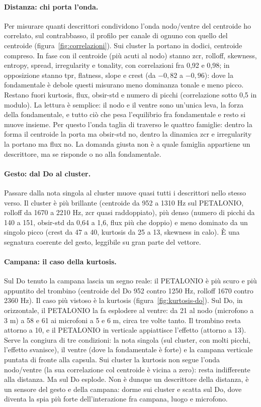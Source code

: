 \documentclass[11pt,a4paper]{article}
\begin{document}
\paragraph{Distanza: chi porta l'onda.} Per misurare quanti descrittori condividono l'onda
nodo/ventre del centroide ho correlato, sul contrabbasso, il profilo per canale di ognuno
con quello del centroide (figura~\ref{fig:correlazioni}). Sui cluster la portano in dodici,
centroide compreso. In fase con il centroide (più acuti al nodo) stanno zcr, rolloff,
skewness, entropy, spread, irregularity e tonality, con correlazioni fra 0,92 e 0,98; in
opposizione stanno tpr, flatness, slope e crest (da $-0{,}82$ a $-0{,}96$): dove la
fondamentale è debole questi misurano meno dominanza tonale e meno picco. Restano fuori
kurtosis, flux, obsir-std e numero di picchi (correlazione sotto 0,5 in modulo). La lettura è semplice: il nodo e il ventre sono un'unica leva, la forza della
fondamentale, e tutto ciò che pesa l'equilibrio fra fondamentale e resto si muove insieme.
Per questo l'onda taglia di traverso le quattro famiglie: dentro la forma il centroide la
porta ma obsir-std no, dentro la dinamica zcr e irregularity la portano ma flux no. La domanda
giusta non è a quale famiglia appartiene un descrittore, ma se risponde o no alla fondamentale.

\paragraph{Gesto: dal Do al cluster.} Passare dalla nota singola al cluster muove quasi tutti
i descrittori nello stesso verso. Il cluster è più brillante (centroide da 952 a 1310 Hz sul
PETALONIO, rolloff da 1670 a 2210 Hz, zcr quasi raddoppiato), più denso (numero di picchi da
140 a 151, obsir-std da 0,64 a 1,6, flux più che doppio) e meno dominato da un singolo picco
(crest da 47 a 40, kurtosis da 25 a 13, skewness in calo). È una segnatura coerente del gesto,
leggibile su gran parte del vettore.

\paragraph{Campana: il caso della kurtosis.} Sul Do tenuto la campana lascia un segno reale:
il PETALONIO è più scuro e più appuntito del trombino (centroide del Do 952 contro 1250 Hz,
rolloff 1670 contro 2360 Hz). Il caso più vistoso è la kurtosis (figura~\ref{fig:kurtosis-do}).
Sul Do, in orizzontale, il PETALONIO la fa esplodere al ventre: da 21 al nodo (microfono a
3 m) a 58 e 61 ai microfoni a 5 e 6 m, circa tre volte tanto. Il trombino resta attorno a
10, e il PETALONIO in verticale appiattisce l'effetto (attorno a 13). Serve la congiura di tre
condizioni: la nota singola (sul cluster, con molti picchi, l'effetto svanisce), il ventre
(dove la fondamentale è forte) e la campana verticale puntata di fronte alla capsula. Sui
cluster la kurtosis non segue l'onda nodo/ventre (la sua correlazione col centroide è vicina
a zero): resta indifferente alla distanza. Ma sul Do esplode. Non è dunque un descrittore
della distanza, è un sensore del gesto e della campana: dorme sui cluster e scatta sul Do,
dove diventa la spia più forte dell'interazione fra campana, luogo e microfono.
\end{document}
